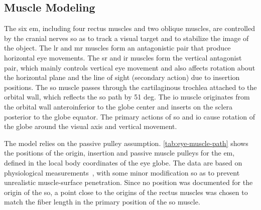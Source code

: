 \documentclass[11pt,a4paper,draft=false]{report}
\begin{document}
\subsection*{Muscle Modeling}\label{sec:muscle-modeling}

The six \gls{em}, including four rectus muscles and two oblique muscles, are
controlled by the cranial nerves so as to track a visual target and to stabilize
the image of the object. The \gls{lr} and \gls{mr} muscles form an antagonistic
pair that produce horizontal eye movements. The \gls{sr} and \gls{ir} muscles
form the vertical antagonist pair, which mainly controls vertical eye movement
and also affects rotation about the horizontal plane and the line of sight
(secondary action) due to insertion positions. The \gls{so} muscle passes
through the cartilaginous trochlea attached to the orbital wall, which reflects
the \gls{so} path by 51 deg. The \gls{io} muscle originates from the orbital
wall anteroinferior to the globe center and inserts on the sclera posterior to
the globe equator. The primary actions of \gls{so} and \gls{io} cause rotation
of the globe around the visual axis and vertical movement.

The model relies on the passive pulley assumption. \autoref{tab:eye-muscle-path}
shows the positions of the origin, insertion and passive muscle pulleys for the
\gls{em}, defined in the local body coordinates of the eye globe. The data are
based on physiological measurements~\cite{Iskander2018}, with some minor
modification so as to prevent unrealistic muscle-surface penetration. Since no
position was documented for the origin of the \gls{so}, a point close to the
origins of the rectus muscles was chosen to match the fiber length in the
primary position of the \gls{so} muscle.
\end{document}

